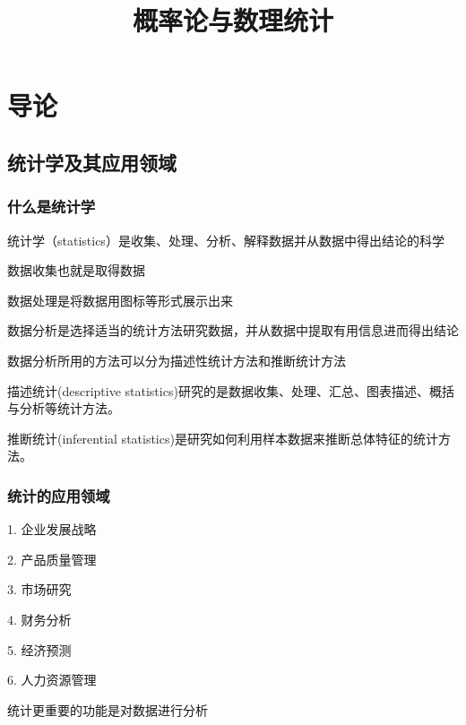 \documentclass[UTF8,10pt]{book}
\begin{document}
    \title{概率论与数理统计}

    \maketitle
    \tableofcontents
    
\clearpage

\chapter{导论}


    \section{统计学及其应用领域}
    \subsection{什么是统计学}
    统计学（statistics）是收集、处理、分析、解释数据并从数据中得出结论的科学

    数据收集也就是取得数据

    数据处理是将数据用图标等形式展示出来

    数据分析是选择适当的统计方法研究数据，并从数据中提取有用信息进而得出结论

    数据分析所用的方法可以分为描述性统计方法和推断统计方法

    描述统计(descriptive statistics)研究的是数据收集、处理、汇总、图表描述、概括与分析等统计方法。

    推断统计(inferential statistics)是研究如何利用样本数据来推断总体特征的统计方法。
    \subsection{统计的应用领域}
    1. 企业发展战略

    2. 产品质量管理

    3. 市场研究

    4. 财务分析

    5. 经济预测

    6. 人力资源管理

    统计更重要的功能是对数据进行分析
\end{document}
